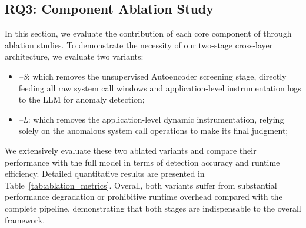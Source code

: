 \label{sec:rq3}

\subsection{RQ3: Component Ablation Study}
In this section, we evaluate the contribution of each core component of \toolname{} through ablation studies. To demonstrate the necessity of our two-stage cross-layer architecture, we evaluate two variants:

\begin{itemize}
    \item \emph{\toolname{}--S}: which removes the unsupervised Autoencoder screening stage, directly feeding all raw system call windows and application-level instrumentation logs to the LLM for anomaly detection;
    \item \emph{\toolname{}--L}: which removes the application-level dynamic instrumentation, relying solely on the anomalous system call operations to make its final judgment;
\end{itemize}

\begin{table}[t!]
    \scriptsize
    \centering
    \caption{Ablation study of \toolname{}.}
    \label{tab:ablation_metrics}
\end{table}


We extensively evaluate these two ablated variants and compare their performance with the full \toolname{} model in terms of detection accuracy and runtime efficiency. Detailed quantitative results are presented in Table~\ref{tab:ablation_metrics}. Overall, both variants suffer from substantial performance degradation or prohibitive runtime overhead compared with the complete pipeline, demonstrating that both stages are indispensable to the overall framework.

